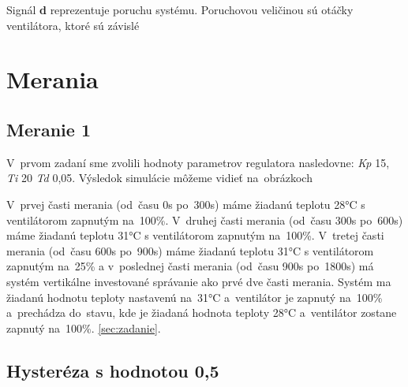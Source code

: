 \documentclass{article}
\begin{document}

Signál \textbf{d} reprezentuje poruchu systému. Poruchovou veličinou sú otáčky ventilátora, ktoré sú závislé

\section{Merania}
\label{sec:merania}

\subsection{Meranie 1}
\label{sec:meranie1}

V~prvom zadaní sme zvolili hodnoty parametrov regulatora nasledovne: \textit{Kp} 15, \textit{Ti} 20 \textit{Td} 0,05. Výsledok simulácie môžeme vidieť na~obrázkoch


\clearpage

V~prvej časti merania (od~času 0s po~300s) máme žiadanú teplotu 28°C s ventilátorom zapnutým na~100\%.
V~druhej časti merania (od~času 300s po~600s) máme žiadanú teplotu 31°C s ventilátorom zapnutým na~100\%.
V~tretej časti merania (od~času 600s po~900s) máme žiadanú teplotu 31°C s ventilátorom zapnutým na~25\% a
v~poslednej časti merania (od~času 900s po~1800s) má systém vertikálne investované správanie ako prvé
dve časti merania. Systém ma žiadanú hodnotu teploty nastavenú na~31°C a~ventilátor je zapnutý na~100\%
a~prechádza do~stavu, kde je žiadaná hodnota teploty 28°C a~ventilátor zostane zapnutý na~100\%.
\ref{sec:zadanie}.

\clearpage

\subsection{Hysteréza s hodnotou 0,5}
\label{sec:meranie2}
\end{document}
